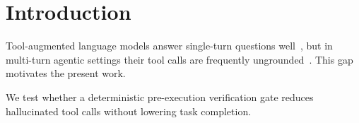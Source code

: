 \section{Introduction}

Tool-augmented language models answer single-turn questions
well~\citep{tooluse2023}, but in multi-turn agentic settings their tool calls
are frequently ungrounded~\citep{halluc2022}. This gap motivates the present
work.


We test whether a deterministic pre-execution verification gate reduces
hallucinated tool calls without lowering task completion.
